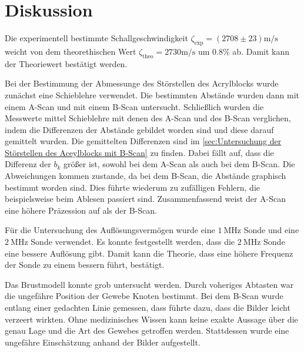 \section{Diskussion}
\label{sec:diskussion}

Die experimentell bestimmte Schallgeschwindigkeit $\zeta_{\text{exp}} = \left(2708 \pm 23\right) \si{\meter \per \second}$ weicht von dem 
theorethischen Wert $\zeta_{\text{theo}} = 2730 \si{\meter \per \second}$ um $0.8 \%$ ab. Damit kann der Theoriewert bestätigt werden.

Bei der Bestimmung der Abmessunge des Störstellen des Acrylblocks wurde zunächst eine Schieblehre verwendet. Die bestimmten Abstände
wurden dann mit einem A-Scan und mit einem B-Scan untersucht. Schließlich wurden die Messwerte mittel Schieblehre mit denen des A-Scan und des 
B-Scan verglichen, indem die Differenzen der Abstände gebildet worden sind und diese darauf gemittelt wurden.  Die gemittelten Differenzen 
sind im \autoref{sec:Untersuchung der Störstellen des Aceylblocks mit B-Scan} zu finden.
Dabei fällt auf, dass die Differenz der $b_k$ größer ist, sowohl bei dem A-Scan als auch bei dem B-Scan.
Die Abweichungen kommen zustande, da bei dem B-Scan, die Abstände graphisch bestimmt worden sind. Dies führte wiederum zu zufälligen Fehlern, die beispielsweise
beim Ablesen passiert sind. Zusammenfassend weist der A-Scan eine höhere Präzession auf als der B-Scan.

Für die Untersuchung des Auflösungsvermögen wurde eine $\SI{1}{\mega\hertz}$ Sonde und eine $\SI{2}{\mega\hertz}$ Sonde verwendet. 
Es konnte festgestellt werden, dass die $\SI{2}{\mega\hertz}$ Sonde eine bessere Auflösung gibt.
Damit kann die Theorie, dass eine höhere Frequenz der Sonde zu einem bessern führt, bestätigt.

Das Brustmodell konnte grob untersucht werden. Durch voheriges Abtasten war die ungefähre Position der Gewebe Knoten bestimmt.
Bei dem B-Scan wurde entlang einer gedachten Linie gemessen, dass führte dazu, dass die Bilder leicht verzeert wirkten. Ohne medizinisches Wissen 
kann keine exakte Aussage über die genau Lage und die Art des Gewebes getroffen werden. Stattdessen wurde eine ungefähre Einschätzung anhand der Bilder 
aufgestellt.